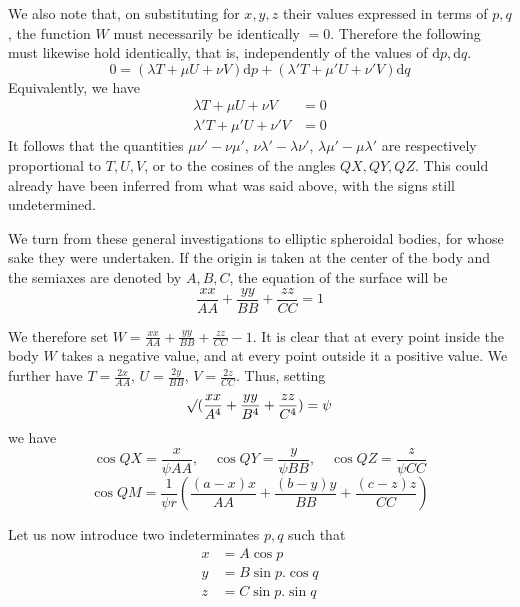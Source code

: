 \par
We also note that, on substituting for $x,y,z$ their values expressed in terms of $p,q$, the function $W$ must necessarily be identically $=0$. Therefore the following must likewise hold identically, that is, independently of the values of $\mathrm{d}p,\mathrm{d}q$.
\[
0=(\lambda T+\mu U+\nu V)\mathrm{d}p+(\lambda'T+\mu'U+\nu'V)\mathrm{d}q
\]
Equivalently, we have
\[
\begin{aligned}
\lambda T+\mu U+\nu V&=0\\
\lambda'T+\mu'U+\nu'V&=0
\end{aligned}
\]
It follows that the quantities $\mu\nu'-\nu\mu'$, $\nu\lambda'-\lambda\nu'$, $\lambda\mu'-\mu\lambda'$ are respectively proportional to $T,U,V$, or to the cosines of the angles $QX,QY,QZ$. This could already have been inferred from what was said above, with the signs still undetermined.

\par
We turn from these general investigations to elliptic spheroidal bodies, for whose sake they were undertaken. If the origin is taken at the center of the body and the semiaxes are denoted by $A,B,C$, the equation of the surface will be
\[
\frac{xx}{AA}+\frac{yy}{BB}+\frac{zz}{CC}=1
\]
\par
We therefore set $W=\frac{xx}{AA}+\frac{yy}{BB}+\frac{zz}{CC}-1$. It is clear that at every point inside the body $W$ takes a negative value, and at every point outside it a positive value. We further have $T=\frac{2x}{AA}$, $U=\frac{2y}{BB}$, $V=\frac{2z}{CC}$. Thus, setting
\[
\mathord{{}^{}\!\surd}(\frac{xx}{A^4}+\frac{yy}{B^4}+\frac{zz}{C^4})=\psi
\]
we have
\[
\cos QX=\frac{x}{\psi AA},\quad\cos QY=\frac{y}{\psi BB},\quad\cos QZ=\frac{z}{\psi CC}
\]
\[
\cos QM=\frac{1}{\psi r}(\frac{(a-x)x}{AA}+\frac{(b-y)y}{BB}+\frac{(c-z)z}{CC})
\]

\par
Let us now introduce two indeterminates $p,q$ such that
\[
\begin{aligned}
x&=A\cos p\\
y&=B\sin p.\cos q\\
z&=C\sin p.\sin q
\end{aligned}
\]
